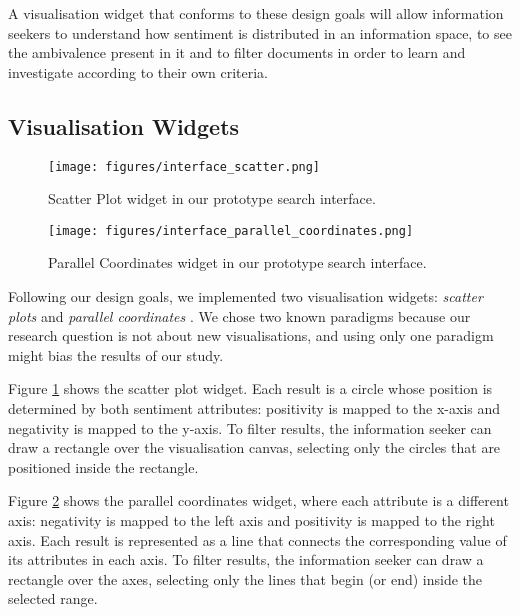 \documentclass{sig-alternate}
\newcommand{\spara}[1]{\smallskip\noindent{\bf #1}}
\begin{document}
A visualisation widget that conforms to these design goals will allow information seekers to understand how sentiment is distributed in an information space, to see the ambivalence present in it and to filter documents in order to learn and investigate according to their own criteria.

\subsection{Visualisation Widgets}

\begin{figure}[htb]
\centering
\texttt{[image: figures/interface\_scatter.png]}
\caption{Scatter Plot widget in our prototype search interface.}
\label{fig:search-starfield}
\end{figure}

\begin{figure}[htb]
\centering
\texttt{[image: figures/interface\_parallel\_coordinates.png]}
\caption{Parallel Coordinates widget in our prototype search interface.}
\label{fig:search-parallel-coordinates}
\end{figure}

Following our design goals, we implemented two visualisation widgets:  \emph{scatter plots} and \emph{parallel coordinates} \cite{inselberg1985plane}. 
We chose two known paradigms because our research question is not about new visualisations, and using only one paradigm might bias the results of our study. 

\spara{Scatter Plot.}
Figure \ref{fig:search-starfield} shows the scatter plot widget. Each result is a circle whose position is determined by both sentiment attributes: positivity is mapped to the x-axis and negativity is mapped to the y-axis. To filter results, the information seeker can draw a rectangle over the visualisation canvas, selecting only the circles that are positioned inside the rectangle. 

\spara{Parallel Coordinates.}
Figure \ref{fig:search-parallel-coordinates} shows the parallel coordinates widget, where each attribute is a different axis: negativity is mapped to the left axis and positivity is mapped to the right axis. Each result is represented as a line that connects the corresponding value of its attributes in each axis. 
To filter results, the information seeker can draw a rectangle over the axes, selecting only the lines that begin (or end) inside the selected range. 
\end{document}
